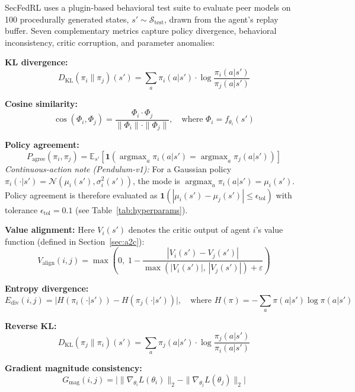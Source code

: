 \documentclass[12pt,a4paper]{article}
\DeclareMathOperator*{\argmax}{argmax}
\begin{document}
SecFedRL uses a plugin-based behavioral test suite to evaluate peer models on 100
procedurally generated states, $s' \sim \mathcal{S}_{\text{test}}$, drawn from the
agent's replay buffer. Seven complementary metrics capture policy divergence,
behavioral inconsistency, critic corruption, and parameter anomalies:

\noindent\textbf{KL divergence:}
\[
  D_{\text{KL}}(\pi_i \| \pi_j)(s') = \sum_a \pi_i(a|s') \cdot \log\frac{\pi_i(a|s')}{\pi_j(a|s')}
\]

\noindent\textbf{Cosine similarity:}
\[
  \cos(\Phi_i, \Phi_j) = \frac{\Phi_i \cdot \Phi_j}{\|\Phi_i\| \cdot \|\Phi_j\|},\quad
  \text{where } \Phi_i = f_{\theta_i}(s')
\]

\noindent\textbf{Policy agreement:}
\[
  P_{\text{agree}}(\pi_i, \pi_j) =
    \mathbb{E}_{s'}\!\left[\mathbf{1}\!\left(\argmax_a \pi_i(a|s') = \argmax_a \pi_j(a|s')\right)\right]
\]
\noindent\textit{Continuous-action note (Pendulum-v1):} For a Gaussian policy
$\pi_i(\cdot|s')=\mathcal{N}(\mu_i(s'),\sigma_i^2(s'))$, the mode is
$\operatorname{argmax}_a\pi_i(a|s')=\mu_i(s')$. Policy agreement is therefore
evaluated as $\mathbf{1}\!\left(|\mu_i(s')-\mu_j(s')|\leq\epsilon_{\text{tol}}\right)$
with tolerance $\epsilon_{\text{tol}}=0.1$ (see Table~\ref{tab:hyperparams}).

\noindent\textbf{Value alignment:}
Here $V_i(s')$ denotes the critic output of agent $i$'s value function (defined in
Section~\ref{sec:a2c}):
\[
  V_{\text{align}}(i,j) =
    \max\!\left(0,\; 1 - \frac{|V_i(s') - V_j(s')|}{\max(|V_i(s')|,\, |V_j(s')|) + \varepsilon}\right)
\]

\noindent\textbf{Entropy divergence:}
\[
  E_{\text{div}}(i,j) = \bigl|H(\pi_i(\cdot|s')) - H(\pi_j(\cdot|s'))\bigr|,\quad
  \text{where } H(\pi) = -\sum_a \pi(a|s')\log\pi(a|s')
\]

\noindent\textbf{Reverse KL:}
\[
  D_{\text{KL}}(\pi_j \| \pi_i)(s') = \sum_a \pi_j(a|s') \cdot \log\frac{\pi_j(a|s')}{\pi_i(a|s')}
\]

\noindent\textbf{Gradient magnitude consistency:}
\[
  G_{\text{mag}}(i,j) = \bigl|\|\nabla_{\theta_i} L(\theta_i)\|_2 - \|\nabla_{\theta_j} L(\theta_j)\|_2\bigr|
\]
\end{document}
